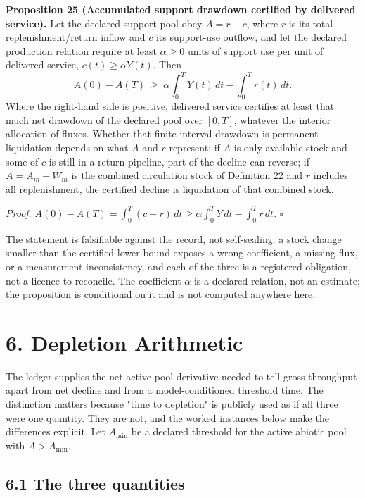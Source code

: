 \documentclass[11pt]{article}
\begin{document}
\textbf{Proposition 25 (Accumulated support drawdown certified by delivered service).} Let the declared support pool obey \(\dot A=r-c\), where \(r\) is its total replenishment/return inflow and \(c\) its support-use outflow, and let the declared production relation require at least \(\alpha\ge0\) units of support use per unit of delivered service, \(c(t)\ge\alpha Y(t)\). Then
$$A(0)-A(T)\ \ge\ \alpha\int_0^TY(t)\,dt-\int_0^Tr(t)\,dt .$$
Where the right-hand side is positive, delivered service certifies at least that much net drawdown of the declared pool over \([0,T]\), whatever the interior allocation of fluxes. Whether that finite-interval drawdown is permanent liquidation depends on what \(A\) and \(r\) represent: if \(A\) is only available stock and some of \(c\) is still in a return pipeline, part of the decline can reverse; if \(A=A_m+W_m\) is the combined circulation stock of Definition 22 and \(r\) includes all replenishment, the certified decline is liquidation of that combined stock.

\emph{Proof.} \(A(0)-A(T)=\allowbreak{}\int_0^T(c-r)\,\allowbreak{}dt\ge\alpha\int_0^TY\,\allowbreak{}dt-\int_0^Tr\,\allowbreak{}dt\). \(\square\)

The statement is falsifiable against the record, not self-sealing: a stock change smaller than the certified lower bound exposes a wrong coefficient, a missing flux, or a measurement inconsistency, and each of the three is a registered obligation, not a licence to reconcile. The coefficient \(\alpha\) is a declared relation, not an estimate; the proposition is conditional on it and is not computed anywhere here.

\vspace{0.8em}

\section*{6. Depletion Arithmetic}\label{6-depletion-arithmetic}

The ledger supplies the net active-pool derivative needed to tell gross throughput apart from net decline and from a model-conditioned threshold time. The distinction matters because "time to depletion" is publicly used as if all three were one quantity. They are not, and the worked instances below make the differences explicit. Let \(A_{\min}\) be a declared threshold for the active abiotic pool with \(A > A_{\min}\).

\subsection*{6.1 The three quantities}\label{61-the-three-quantities}
\end{document}
